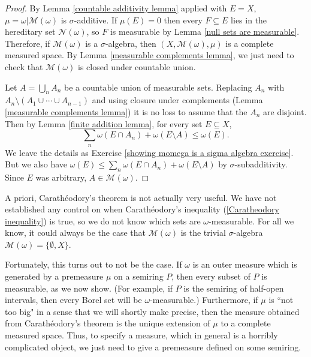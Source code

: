 \begin{proof}
By Lemma \ref{countable additivity lemma} applied with $E = X$, $\mu = \omega|\mathcal M(\omega)$ is $\sigma$-additive.
If $\mu(E) = 0$ then every $F \subseteq E$ lies in the hereditary set $\mathcal N(\omega)$, so $F$ is measurable by Lemma \ref{null sets are measurable}.
Therefore, if $\mathcal M(\omega)$ is a $\sigma$-algebra, then $(X, \mathcal M(\omega), \mu)$ is a complete measured space.
By Lemma \ref{measurable complements lemma}, we just need to check that $\mathcal M(\omega)$ is closed under countable union.

Let $A = \bigcup_{n} A_{n}$ be a countable union of measurable sets.
Replacing $A_{n}$ with $A_{n} \setminus (A_{1} \cup \cdots \cup A_{n-1})$ and using closure under complements (Lemma \ref{measurable complements lemma}) it is no loss to assume that the $A_{n}$ are disjoint.
Then by Lemma \ref{finite addition lemma}, for every set $E \subseteq X$,
\begin{equation}
\label{showing momega is a sigma algebra}
\sum_{n} \omega(E \cap A_{n}) + \omega(E \setminus A) \leq \omega(E).
\end{equation}
We leave the details as Exercise \ref{showing momega is a sigma algebra exercise}.
But we also have $\omega(E) \leq \sum_{n} \omega(E \cap A_{n}) + \omega(E \setminus A)$ by $\sigma$-subadditivity.
Since $E$ was arbitrary, $A \in \mathcal M(\omega)$.
\end{proof}

\begin{subsec}
A priori, Carathéodory's theorem is not actually very useful.
We have not established any control on when Carathéodory's inequality (\ref{Caratheodory inequality}) is true, so we do not know which sets are $\omega$-measurable.
For all we know, it could always be the case that $\mathcal M(\omega)$ is the trivial $\sigma$-algebra $\mathcal M(\omega) = \{\emptyset, X\}$.

Fortunately, this turns out to not be the case.
If $\omega$ is an outer measure which is generated by a premeasure $\mu$ on a semiring $P$, then every subset of $P$ is measurable, as we now show.
(For example, if $P$ is the semiring of half-open intervals, then every Borel set will be $\omega$-measurable.)
Furthermore, if $\mu$ is ``not too big" in a sense that we will shortly make precise, then the measure obtained from Carathéodory's theorem is the unique extension of $\mu$ to a complete measured space.
Thus, to specify a measure, which in general is a horribly complicated object, we just need to give a premeasure defined on some semiring.
\end{subsec}

